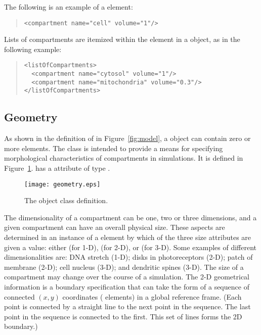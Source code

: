\documentclass[10pt]{cek-article}
\begin{document}
The following is an example of a  element:
\begin{quote}
\begin{small}
\tightspacing
\begin{verbatim}
<compartment name="cell" volume="1"/>
\end{verbatim}
\regularspacing
\end{small}
\end{quote}

Lists of compartments are itemized within the element
 in a  object, as in the
following example:

\begin{quote}
\begin{small}
\tightspacing
\begin{verbatim}
<listOfCompartments>
  <compartment name="cytosol" volume="1"/>
  <compartment name="mitochondria" volume="0.3"/>
</listOfCompartments>
\end{verbatim}
\regularspacing
\end{small}
\end{quote}

\subsection{Geometry}

As shown in the definition of  in Figure~\ref{fig:model}, a
 object can contain zero or more  elements.
The  class is intended to provide a means for specifying
morphological characteristics of compartments in simulations.  It is
defined in Figure~\ref{fig:geometry}.   has a  attribute of type .

\begin{figure}[thb]
  \centering
  \texttt{[image: geometry.eps]}
  \caption{The  object class definition.}
  \label{fig:geometry}
\end{figure}

The dimensionality of a compartment can be one, two or three dimensions,
and a given compartment can have an overall physical size.  These aspects
are determined in an instance of a  element by which of the
three size attributes are given a value: either  (for 1-D),
 (for 2-D), or  (for 3-D).  Some
examples of different dimensionalities are: DNA stretch (1-D); disks in
photoreceptors (2-D); patch of membrane (2-D); cell nucleus (3-D); and
dendritic spines (3-D).  The size of a compartment may change over the
course of a simulation.  The 2-D geometrical information is a boundary
specification that can take the form of a sequence of connected $(x,y)$
coordinates ( elements) in a global reference frame.  (Each
point is connected by a straight line to the next point in the sequence.
The last point in the sequence is connected to the first.  This set of
lines forms the 2D boundary.)
\end{document}
